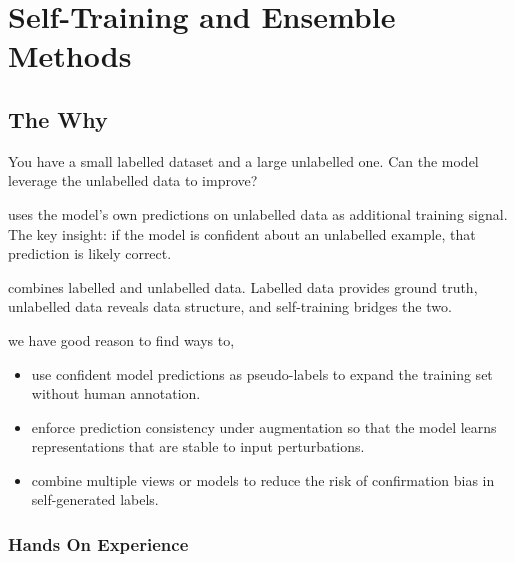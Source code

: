 
\chapter{Self-Training and Ensemble Methods}


\section{The Why}


You have a small labelled dataset and a large unlabelled one. Can the model leverage the unlabelled data to improve?

 uses the model's own predictions on unlabelled data as additional training signal. The key insight: if the model is confident about an unlabelled example, that prediction is likely correct.

 combines labelled and unlabelled data. Labelled data provides ground truth, unlabelled data reveals data structure, and self-training bridges the two.

 we have good reason to find ways to,
\begin{itemize}
    \item use confident model predictions as pseudo-labels to expand the training set without human annotation.
    \item enforce prediction consistency under augmentation so that the model learns representations that are stable to input perturbations.
    \item combine multiple views or models to reduce the risk of confirmation bias in self-generated labels.
\end{itemize}

\subsection{Hands On Experience}

